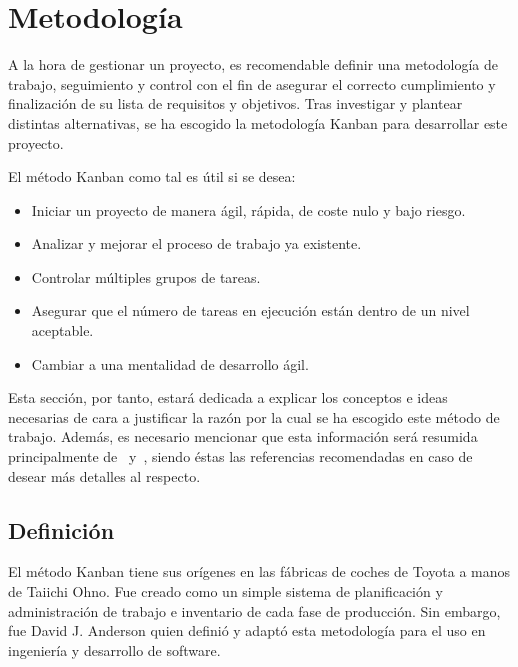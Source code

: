 \section{Metodología}\label{sec:metodologia}

A la hora de gestionar un proyecto, es recomendable definir una metodología de
trabajo, seguimiento y control con el fin de asegurar el correcto cumplimiento y
finalización de su lista de requisitos y objetivos. Tras investigar y plantear
distintas alternativas, se ha escogido la metodología Kanban para desarrollar
este proyecto.

El método Kanban como tal es útil si se desea:
\begin{itemize}
    \item Iniciar un proyecto de manera ágil, rápida, de coste nulo y bajo riesgo. %
    \item Analizar y mejorar el proceso de trabajo ya existente. %
    \item Controlar múltiples grupos de tareas. %
    \item Asegurar que el número de tareas en ejecución están dentro de un nivel aceptable. %
    \item Cambiar a una mentalidad de desarrollo ágil. %
\end{itemize}

Esta sección, por tanto, estará dedicada a explicar los conceptos e ideas
necesarias de cara a justificar la razón por la cual se ha escogido este método
de trabajo. Además, es necesario mencionar que esta información será resumida
principalmente de~\cite{Cole2015-fd} y~\cite{Stellman2014-qr}, siendo éstas las
referencias recomendadas en caso de desear más detalles al respecto.
\subsection{Definición}

El método Kanban tiene sus orígenes en las fábricas de coches de Toyota a manos
de Taiichi Ohno. Fue creado como un simple sistema de planificación y
administración de trabajo e inventario de cada fase de producción. Sin embargo,
fue David J. Anderson quien definió y adaptó esta metodología para el uso en
ingeniería y desarrollo de software.


